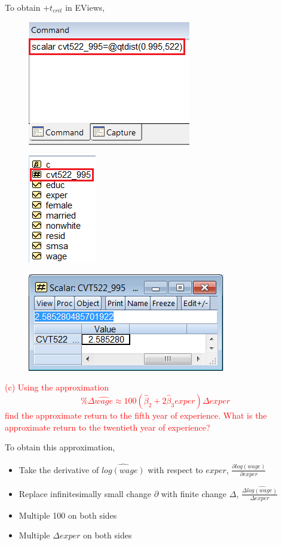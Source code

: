 \documentclass[12pt]{report}
\begin{document}
\noindent To obtain $+t_{crit}$ in EViews,
\begin{figure}[H]
	\centering
	\includegraphics{q2_4}
\end{figure}
\vspace{-\baselineskip}
\begin{figure}[H]
	\centering
	\includegraphics{q2_5}
\end{figure}
\vspace{-\baselineskip}
\begin{figure}[H]
	\centering
	\includegraphics{q2_6}
\end{figure}
\vspace{-\baselineskip}


\newpage
\noindent \textcolor{red}{(c) Using the approximation
	$$\%\Delta\widehat{wage} \approx 100(\hat{\beta}_2 + 2\hat{\beta}_3exper){\Delta}exper$$
	find the approximate return to the fifth year of experience. What is the approximate return to the twentieth year of experience?}

\noindent To obtain this approximation, \begin{itemize}
	\item Take the derivative of $\widehat{log(wage)}$ with respect to $exper$, $\frac{\partial\widehat{log(wage)}}{\partial exper}$
	\item Replace infinitesimally small change $\partial$ with finite change $\Delta$, $\frac{\Delta \widehat{log(wage)}}{\Delta exper}$
	\item Multiple 100 on both sides
	\item Multiple $\Delta exper$ on both sides
\end{itemize}
\end{document}
